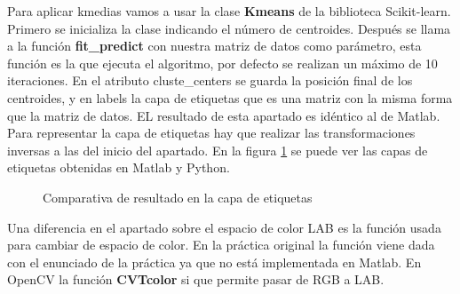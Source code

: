 \documentclass[a4paper,12pt]{report}
\begin{document}
Para aplicar kmedias vamos a usar la clase \textbf{Kmeans} de la biblioteca Scikit-learn. Primero se inicializa la clase indicando el número de centroides. Después se llama a la función \textbf{fit\_predict} con nuestra matriz de datos como parámetro, esta función es la que ejecuta el algoritmo, por defecto se realizan un máximo de 10 iteraciones. En el atributo cluste\_centers se guarda la posición final de los centroides, y en labels la capa de etiquetas que es una matriz con la misma forma que la matriz de datos. EL resultado de esta apartado es idéntico al de Matlab. \\

Para representar la capa de etiquetas hay que realizar las transformaciones inversas a las del inicio del apartado. En la figura \ref{comprgb} se puede ver las capas de etiquetas obtenidas en Matlab y Python. \\

\begin{figure}[!tbp]
  \centering
  \hfill
  \caption{Comparativa de resultado en la capa de etiquetas}
  \label{comprgb}
\end{figure}

Una diferencia en el apartado sobre el espacio de color LAB es la función usada para cambiar de espacio de color. En la práctica original la función viene dada con el enunciado de la práctica ya que no está implementada en Matlab. En OpenCV la función \textbf{CVTcolor} si que permite pasar de RGB a LAB.\\
\end{document}
